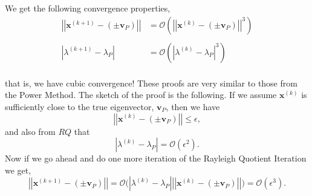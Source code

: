 \documentclass[paper=a4, fontsize=11pt]{scrartcl} %
\numberwithin{equation}{section} %
\numberwithin{figure}{section} %
\numberwithin{table}{section} %
\begin{document}
We get the following convergence properties,
\begin{align*}
\left|\left| \textbf{x}^{(k+1)} - \left( \pm \textbf{v}_P \right) \right|\right| &= \mathcal{O}\left( \left|\left| \textbf{x}^{(k)} - \left( \pm \textbf{v}_P \right)   \right|\right|^3   \right) \\ \\
\left| \lambda^{(k+1)} - \lambda_P \right| &= \mathcal{O}\left( \left| \lambda^{(k)} - \lambda_P  \right|^3   \right) \\
\end{align*}

that is, we have cubic convergence! These proofs are very similar to those from the Power Method. The sketch of the proof is the following. If we assume $\textbf{x}^{(k)}$ is sufficiently close to the true eigenvector, $\textbf{v}_P$, then we have
 $$\left|\left|  \textbf{x}^{(k)} - \left( \pm \textbf{v}_P \right)   \right|\right| \leq \epsilon,$$
and also from $RQ$ that 
$$\left| \lambda^{(k)} - \lambda_P  \right| = \mathcal{O}\left( \epsilon^2 \right).$$
Now if we go ahead and do one more iteration of the Rayleigh Quotient Iteration we get,
$$ \left|\left| \textbf{x}^{(k+1)} - \left( \pm \textbf{v}_P \right) \right|\right| = \mathcal{O}\Bigg(  \left| \lambda^{(k)} - \lambda_P  \right|       \left|\left| \textbf{x}^{(k)} - \left( \pm \textbf{v}_P \right) \right|\right|    \Bigg) = \mathcal{O}\left( \epsilon^3  \right).$$
\end{document}
